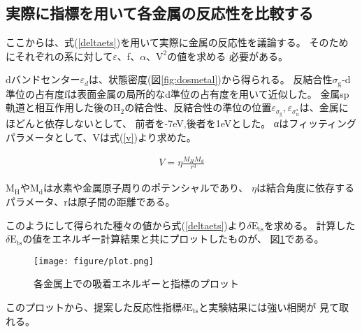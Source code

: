 \documentclass[12pt]{ltjsarticle}
\begin{document}
\subsection{実際に指標を用いて各金属の反応性を比較する}
ここからは、式(\ref{deltaets})を用いて実際に金属の反応性を議論する。
そのためにそれぞれの系に対して$\varepsilon$、f、$\alpha$、$\text{V}^\text{2}$の値を求める
必要がある。

dバンドセンター$\varepsilon_d$は、状態密度(図\ref{fig:dosmetal})から得られる。
反結合性$\sigma_\text{g}$-d準位の占有度fは表面金属の局所的なd準位の占有度を用いて近似した。
金属sp軌道と相互作用した後の$\text{H}_\text{2}$の結合性、反結合性の準位の位置$\varepsilon _
{\sigma_\text{g}},\varepsilon _{\sigma_\text{u}^*}$は、金属にほどんと依存しないとして、
前者を-7eV,後者を1eVとした。
αはフィッティングパラメータとして、Vは式(\ref{v})より求めた。\cite{Norskov1989}

\begin{eqnarray}
    \label{v}
    V = \eta \frac{ M_H M_d }{r^3}
\end{eqnarray}

$\text{M}_\text{H}$や$\text{M}_\text{d}$は水素や金属原子周りのポテンシャルであり、
$\eta$は結合角度に依存するパラメータ、rは原子間の距離である。

このようにして得られた種々の値から式(\ref{deltaets})より$\delta \text{E}_\text{ts}$を求める。
計算した$\delta \text{E}_\text{ts}$の値をエネルギー計算結果と共にプロットしたものが、
図\ref{fig:plot}である。

\begin{figure}[hbtp]
    \begin{center}
     \texttt{[image: figure/plot.png]}
    \end{center}
    \caption{各金属上での吸着エネルギーと指標のプロット}
    \label{fig:plot}
\end{figure}
このプロットから、提案した反応性指標$\delta \text{E}_\text{ts}$と実験結果には強い相関が
見て取れる。
\end{document}
